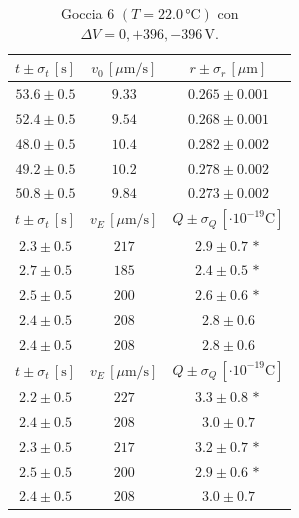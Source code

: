 \documentclass[]{article}
\begin{document}
    \begin{table}[H]
        \centering
        \begin{tabular}{||c|c|c||}
            \hline
            $t \pm \sigma_t \, \left[\text{s}\right]$ & $v_0 \, \left[\mu\text{m/s}\right]$ & $r \pm \sigma_r \, \left[\mu\text{m}\right]$ \\\hline
            \hline
            $53.6 \pm 0.5$ & $9.33$ & $0.265 \pm 0.001$ \\\hline
            $52.4 \pm 0.5$ & $9.54$ & $0.268 \pm 0.001$ \\\hline
            $48.0 \pm 0.5$ & $10.4$ & $0.282 \pm 0.002$ \\\hline
            $49.2 \pm 0.5$ & $10.2$ & $0.278 \pm 0.002$ \\\hline
            $50.8 \pm 0.5$ & $9.84$ & $0.273 \pm 0.002$ \\\hline
            \hline
            $t \pm \sigma_t \, \left[\text{s}\right]$ & $v_E \, \left[\mu\text{m/s}\right]$ & $Q \pm \sigma_Q \, \left[\cdot 10^{-19} \text{C}\right]$ \\\hline
            \hline
            $2.3 \pm 0.5$ & $217$ & $2.9 \pm 0.7\,\ast$ \\\hline
            $2.7 \pm 0.5$ & $185$ & $2.4 \pm 0.5\,\ast$ \\\hline
            $2.5 \pm 0.5$ & $200$ & $2.6 \pm 0.6\,\ast$ \\\hline
            $2.4 \pm 0.5$ & $208$ & $2.8 \pm 0.6$ \\\hline
            $2.4 \pm 0.5$ & $208$ & $2.8 \pm 0.6$ \\\hline
            \hline
            $t \pm \sigma_t \, \left[\text{s}\right]$ & $v_E \, \left[\mu\text{m/s}\right]$ & $Q \pm \sigma_Q \, \left[\cdot 10^{-19} \text{C}\right]$ \\\hline
            \hline
            $2.2 \pm 0.5$ & $227$ & $3.3 \pm 0.8\,\ast$ \\\hline
            $2.4 \pm 0.5$ & $208$ & $3.0 \pm 0.7$ \\\hline
            $2.3 \pm 0.5$ & $217$ & $3.2 \pm 0.7\,\ast$ \\\hline
            $2.5 \pm 0.5$ & $200$ & $2.9 \pm 0.6\,\ast$ \\\hline
            $2.4 \pm 0.5$ & $208$ & $3.0 \pm 0.7$ \\\hline
        \end{tabular}
        \caption{Goccia 6 $\left(T = 22.0\, \text{°C}\right)$ con $\Delta V = 0,+396,-396 \,\text{V}$.}
        \label{goccia-6}
    \end{table}
\end{document}
